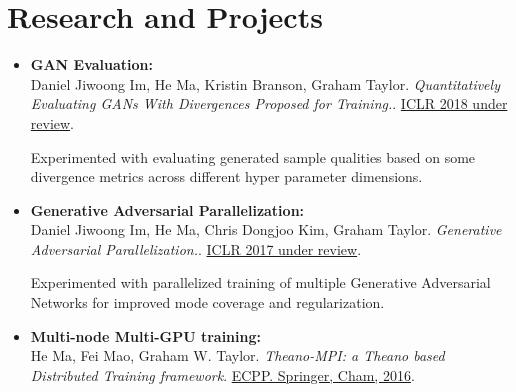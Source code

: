 \documentclass[11pt,a4paper,geogia]{moderncv}        %
\begin{document}
				\vspace{2pt}
				
				
				\section{Research and Projects}
				
				\vspace{5pt}
				
				\begin{itemize}
					\item{\textbf{GAN Evaluation:} \\ Daniel Jiwoong Im, He Ma, Kristin Branson, Graham Taylor. \textit{Quantitatively Evaluating GANs With Divergences Proposed for Training.}. \href{https://openreview.net/forum?id=SJQHjzZ0-}{ICLR 2018 under review}.
						
						\vspace{3pt}
						
						Experimented with evaluating generated sample qualities based on some divergence metrics across different hyper parameter dimensions.}
					
					\vspace{6pt}
					
					\item{\textbf{Generative Adversarial Parallelization:} \\ Daniel Jiwoong Im, He Ma, Chris Dongjoo Kim, Graham Taylor. \textit{Generative Adversarial Parallelization.}. \href{https://openreview.net/pdf?id=Sk8J83oee}{ICLR 2017 under review}.
						
						\vspace{3pt}
						
						Experimented with parallelized training of multiple Generative Adversarial Networks for improved mode coverage and regularization.}
					
					\vspace{6pt}
					
					\item{\textbf{Multi-node Multi-GPU training:} \\ He Ma, Fei Mao, Graham W. Taylor. \textit{Theano-MPI: a Theano based Distributed Training framework}. \href{https://link.springer.com/chapter/10.1007/978-3-319-58943-5_64}{ECPP. Springer, Cham, 2016}.
						
						\vspace{3pt}
						
}
\end{itemize}
\end{document}
